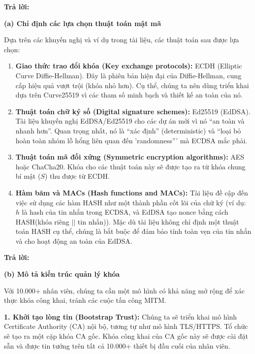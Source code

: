 \begin{center}
    \textbf{Trả lời:}
\end{center}

\textbf{(a) Chỉ định các lựa chọn thuật toán mật mã}

Dựa trên các khuyến nghị và ví dụ trong tài liệu, các thuật toán sau được lựa chọn:

\begin{enumerate}
    \item \textbf{Giao thức trao đổi khóa (Key exchange protocols):} ECDH (Elliptic Curve Diffie-Hellman). Đây là phiên bản hiện đại của Diffie-Hellman, cung cấp hiệu quả vượt trội (khóa nhỏ hơn). Cụ thể, chúng ta nên dùng triển khai dựa trên Curve25519 vì các tham số minh bạch và thiết kế an toàn của nó.
    
    \item \textbf{Thuật toán chữ ký số (Digital signature schemes):} Ed25519 (EdDSA). Tài liệu khuyến nghị EdDSA/Ed25519 cho các dự án mới vì nó ``an toàn và nhanh hơn''. Quan trọng nhất, nó là ``xác định'' (deterministic) và ``loại bỏ hoàn toàn nhóm lỗ hổng liên quan đến 'randomness''' mà ECDSA mắc phải.
    
    \item \textbf{Thuật toán mã đối xứng (Symmetric encryption algorithms):} AES hoặc ChaCha20. Khóa cho các thuật toán này sẽ được tạo ra từ khóa chung bí mật ($S$) thu được từ ECDH.
    
    \item \textbf{Hàm băm và MACs (Hash functions and MACs):} Tài liệu đề cập đến việc sử dụng các hàm HASH như một thành phần cốt lõi của chữ ký (ví dụ: $h$ là hash của tin nhắn trong ECDSA, và EdDSA tạo nonce bằng cách HASH(khóa riêng $||$ tin nhắn)). Mặc dù tài liệu không chỉ định một thuật toán HASH cụ thể, chúng là bắt buộc để đảm bảo tính toàn vẹn của tin nhắn và cho hoạt động an toàn của EdDSA.
\end{enumerate}

\begin{center}
    \textbf{Trả lời:}
\end{center}

\textbf{(b) Mô tả kiến trúc quản lý khóa}

Với 10.000+ nhân viên, chúng ta cần một mô hình có khả năng mở rộng để xác thực khóa công khai, tránh các cuộc tấn công MITM.

\textbf{1. Khởi tạo lòng tin (Bootstrap Trust):} Chúng ta sẽ triển khai mô hình Certificate Authority (CA) nội bộ, tương tự như mô hình TLS/HTTPS. Tổ chức sẽ tạo ra một cặp khóa CA gốc. Khóa công khai của CA gốc này sẽ được cài đặt sẵn và được tin tưởng trên tất cả 10.000+ thiết bị đầu cuối của nhân viên.

